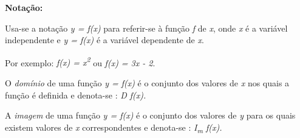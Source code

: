 \begin{caixa}
\textbf{Notação:}

Usa-se a notação \textit{y = f(x)} para referir-se à função \textit{f} de \textit{x}, onde \textit{x} é a variável independente e \textit{y = f(x)}  é a variável dependente de \textit{x}.

Por exemplo:   \textit{f(x) = x\textsuperscript{2}}        ou      \textit{f(x) = 3x - 2}.
\end{caixa}

\begin{caixa}
\begin{tdefinicao}
O \textit{domínio} de uma função \textit{y = f(x)} é o conjunto dos valores de \textit{x} nos quais a função é definida e denota-se :   \textit{D f(x).}
\end{tdefinicao}

\begin{tdefinicao}
A \textit{imagem} de uma função \textit{y = f(x)} é o conjunto dos valores de \textit{y }para os quais existem valores de \textit{x} correspondentes e denota-se : \textit{I\textsubscript{m} f(x).}
\end{tdefinicao}
\end{caixa}

